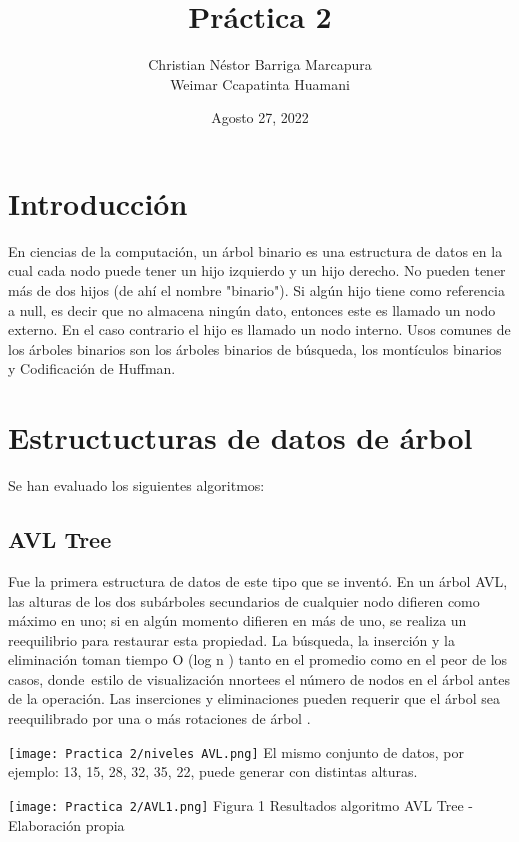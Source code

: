 \documentclass{article}
\title{Práctica 2}
\author{Christian Néstor Barriga Marcapura\\
        Weimar Ccapatinta Huamani}
\date{Agosto 27, 2022}
\begin{document}
\maketitle

\tableofcontents
\newpage
\pagestyle{fancy}
\fancyhf{}
\rfoot{\thepage}{}
\section{Introducción}
\doublespacing En ciencias de la computación, un árbol binario es una estructura de datos en la cual cada nodo puede tener un hijo izquierdo y un hijo derecho. No pueden tener más de dos hijos (de ahí el nombre "binario"). Si algún hijo tiene como referencia a null, es decir que no almacena ningún dato, entonces este es llamado un nodo externo. En el caso contrario el hijo es llamado un nodo interno. Usos comunes de los árboles binarios son los árboles binarios de búsqueda, los montículos binarios y Codificación de Huffman.

\section{Estructucturas de datos de árbol}
\doublespacing Se han evaluado los siguientes algoritmos:
\subsection{AVL Tree}
 Fue la primera estructura de datos de este tipo que se inventó. En un árbol AVL, las alturas de los dos subárboles secundarios de cualquier nodo difieren como máximo en uno; si en algún momento difieren en más de uno, se realiza un reequilibrio para restaurar esta propiedad. La búsqueda, la inserción y la eliminación toman tiempo O (log n ) tanto en el promedio como en el peor de los casos, donde{\ estilo de visualización n}nortees el número de nodos en el árbol antes de la operación. Las inserciones y eliminaciones pueden requerir que el árbol sea reequilibrado por una o más rotaciones de árbol .
 
 \center\texttt{[image: Practica 2/niveles AVL.png]}
 \center El mismo conjunto de datos, por ejemplo: 13, 15, 28, 32, 35, 22, puede generar con distintas alturas.

 \center\texttt{[image: Practica 2/AVL1.png]}
 \center Figura 1 Resultados algoritmo AVL Tree - Elaboración propia
\newpage\
 
\end{document}
